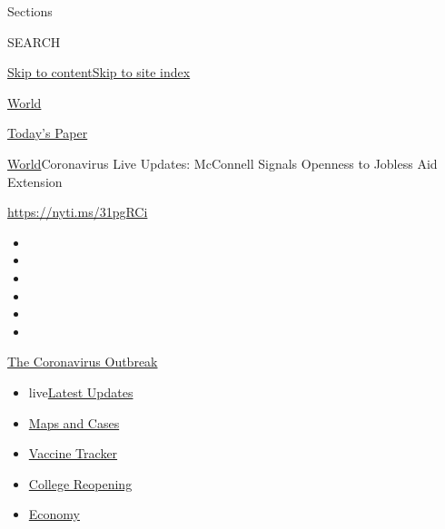Sections

SEARCH

\protect\hyperlink{site-content}{Skip to
content}\protect\hyperlink{site-index}{Skip to site index}

\href{https://www.nytimes.com/section/world}{World}

\href{https://myaccount.nytimes.com/auth/login?response_type=cookie\&client_id=vi}{}

\href{https://www.nytimes.com/section/todayspaper}{Today's Paper}

\href{/section/world}{World}\textbar{}Coronavirus Live Updates:
McConnell Signals Openness to Jobless Aid Extension

\url{https://nyti.ms/31pgRCi}

\begin{itemize}
\item
\item
\item
\item
\item
\item
\end{itemize}

\href{https://www.nytimes.com/news-event/coronavirus?action=click\&pgtype=Article\&state=default\&region=TOP_BANNER\&context=storylines_menu}{The
Coronavirus Outbreak}

\begin{itemize}
\tightlist
\item
  live\href{https://www.nytimes.com/2020/08/04/world/coronavirus-cases.html?action=click\&pgtype=Article\&state=default\&region=TOP_BANNER\&context=storylines_menu}{Latest
  Updates}
\item
  \href{https://www.nytimes.com/interactive/2020/us/coronavirus-us-cases.html?action=click\&pgtype=Article\&state=default\&region=TOP_BANNER\&context=storylines_menu}{Maps
  and Cases}
\item
  \href{https://www.nytimes.com/interactive/2020/science/coronavirus-vaccine-tracker.html?action=click\&pgtype=Article\&state=default\&region=TOP_BANNER\&context=storylines_menu}{Vaccine
  Tracker}
\item
  \href{https://www.nytimes.com/2020/08/02/us/covid-college-reopening.html?action=click\&pgtype=Article\&state=default\&region=TOP_BANNER\&context=storylines_menu}{College
  Reopening}
\item
  \href{https://www.nytimes.com/live/2020/08/04/business/stock-market-today-coronavirus?action=click\&pgtype=Article\&state=default\&region=TOP_BANNER\&context=storylines_menu}{Economy}
\end{itemize}

